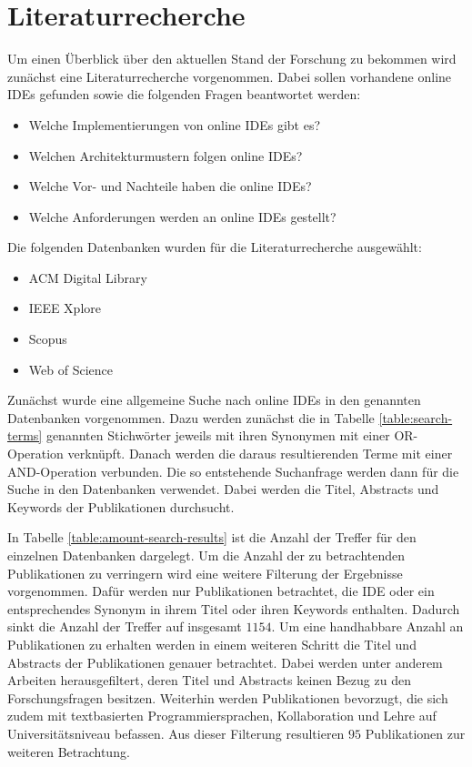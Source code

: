 \section{Literaturrecherche} \label{literaturrecherche}

Um einen Überblick über den aktuellen Stand der Forschung zu bekommen wird zunächst eine Literaturrecherche vorgenommen. Dabei sollen vorhandene online IDEs gefunden sowie die folgenden Fragen beantwortet werden:

\begin{itemize}
    \item Welche Implementierungen von online IDEs gibt es?
    \item Welchen Architekturmustern folgen online IDEs?
    \item Welche Vor- und Nachteile haben die online IDEs?
    \item Welche Anforderungen werden an online IDEs gestellt?
\end{itemize}

Die folgenden Datenbanken wurden für die Literaturrecherche ausgewählt:

\begin{itemize}
    \item ACM Digital Library
    \item IEEE Xplore
    \item Scopus
    \item Web of Science
\end{itemize}

Zunächst wurde eine allgemeine Suche nach online IDEs in den genannten Datenbanken vorgenommen. Dazu werden zunächst die in Tabelle \ref{table:search-terms} genannten Stichwörter jeweils mit ihren Synonymen mit einer OR-Operation verknüpft. Danach werden die daraus resultierenden Terme mit einer AND-Operation verbunden. Die so entstehende Suchanfrage werden dann für die Suche in den Datenbanken verwendet. Dabei werden die Titel, Abstracts und Keywords der Publikationen durchsucht.

In Tabelle \ref{table:amount-search-results} ist die Anzahl der Treffer für den einzelnen Datenbanken dargelegt. Um die Anzahl der zu betrachtenden Publikationen zu verringern wird eine weitere Filterung der Ergebnisse vorgenommen. Dafür werden nur Publikationen betrachtet, die IDE oder ein entsprechendes Synonym in ihrem Titel oder ihren Keywords enthalten. Dadurch sinkt die Anzahl der Treffer auf insgesamt $1154$. Um eine handhabbare Anzahl an Publikationen zu erhalten werden in einem weiteren Schritt die Titel und Abstracts der Publikationen genauer betrachtet. Dabei werden unter anderem Arbeiten herausgefiltert, deren Titel und Abstracts keinen Bezug zu den Forschungsfragen besitzen. Weiterhin werden Publikationen bevorzugt, die sich zudem mit textbasierten Programmiersprachen, Kollaboration und Lehre auf Universitätsniveau befassen. Aus dieser Filterung resultieren $95$ Publikationen zur weiteren Betrachtung. \\

